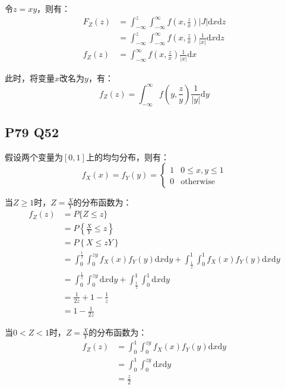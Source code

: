 \documentclass[a4paper,12pt]{ctexart}
\begin{document}
令$z = xy$，则有：
\begin{align*}
	F_Z(z) &= \int_{-\infty}^z \int_{-\infty}^{\infty} f \left(x, \frac{z}{x}\right) | J | \mathrm{d} x \mathrm{d} z \\
	&= \int_{-\infty}^z \int_{-\infty}^{\infty} f \left(x, \frac{z}{x}\right) \frac{1}{|x|} \mathrm{d} x \mathrm{d} z \\
	f_Z(z) &= \int_{-\infty}^{\infty} f \left(x, \frac{z}{x}\right) \frac{1}{|x|} \mathrm{d} x
\end{align*}

此时，将变量$x$改名为$y$，有：
\begin{equation*}
	f_Z(z) = \int_{-\infty}^{\infty} f \left(y, \frac{z}{y}\right) \frac{1}{|y|} \mathrm{d} y
\end{equation*}

\subsection*{P79 Q52}

假设两个变量为$[0,1]$上的均匀分布，则有：
\begin{equation*}
	f_X(x) = f_Y(y) =
	\begin{cases}
		1 & 0 \leq x, y \leq 1 \\
		0 & \text{otherwise}
	\end{cases}
\end{equation*}

当$Z \geq 1$时，$Z = \frac{X}{Y}$的分布函数为：
\begin{align*}
	f_Z(z) &= P\{Z \leq z\} \\
	&= P\left\{\frac{X}{Y} \leq z\right\} \\
	&= P\left\{X \leq zY\right\} \\
	&= \int_0^{\frac{1}{z}} \int_0^{zy} f_X(x)f_Y(y) \mathrm{d} x \mathrm{d} y + \int_{\frac{1}{z}}^1 \int_0^1 f_X(x)f_Y(y) \mathrm{d} x \mathrm{d} y \\
	&= \int_0^{\frac{1}{z}} \int_0^{zy} \mathrm{d} x \mathrm{d} y + \int_{\frac{1}{z}}^1 \int_0^1 \mathrm{d} x \mathrm{d} y \\
	&= \frac{1}{2z} + 1 - \frac{1}{z} \\
	&= 1 - \frac{1}{2z}
\end{align*}

当$0 < Z < 1$时，$Z = \frac{X}{Y}$的分布函数为：
\begin{align*}
	f_Z(z) &= \int_0^1 \int_0^{zy} f_X(x)f_Y(y) \mathrm{d} x \mathrm{d} y \\
	&= \int_0^1 \int_0^{zy} \mathrm{d} x \mathrm{d} y \\
	&= \frac{z}{2}
\end{align*}
\end{document}

